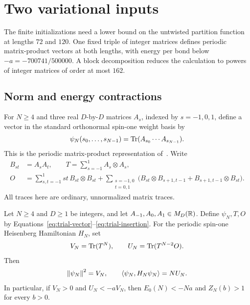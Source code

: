 \section{Two variational inputs}\label{sec:trials}

The finite initializations need a lower bound on the untwisted partition
function at lengths $72$ and $120$. One fixed triple of integer matrices
defines periodic matrix-product vectors at both lengths, with energy per bond below
$-a=-700741/500000$. A block decomposition reduces the calculation to
powers of integer matrices of order at most $162$.

\subsection{Norm and energy contractions}

For $N\ge4$ and three real $D$-by-$D$ matrices $A_s$, indexed by $s=-1,0,1$, define
a vector in the standard orthonormal spin-one weight basis by
\begin{equation}\label{eq:trial-vector}
 \psi_N(s_0,\ldots,s_{N-1})
 =\operatorname{Tr}(A_{s_0}\cdots A_{s_{N-1}}).
\end{equation}
This is the periodic matrix-product representation
of~\cite[Section~2.1, Equations~(2)--(3)]{PerezGarcia2007}.
Write
\begin{align}
 B_{st}&=A_sA_t,\qquad T=\sum_{s=-1}^1 A_s\otimes A_s,
 \label{eq:trial-transfer}\\
 O&=\sum_{s,t=-1}^1 st\,B_{st}\otimes B_{st}
   +\sum_{\substack{s=-1,0\\t=0,1}}
    \bigl(B_{st}\otimes B_{s+1,t-1}
       +B_{s+1,t-1}\otimes B_{st}\bigr).
 \label{eq:trial-insertion}
\end{align}
All traces here are ordinary, unnormalized matrix traces.

\begin{lemma}\label{lem:trial-contraction}
Let $N\ge4$ and $D\ge1$ be integers, and let $A_{-1},A_0,A_1\in M_D(\mathbb R)$.
Define $\psi_N,T,O$ by Equations~\eqref{eq:trial-vector}--\eqref{eq:trial-insertion}.
For the periodic spin-one Heisenberg Hamiltonian $H_N$, set
\[
 V_N=\operatorname{Tr}(T^N),\qquad U_N=\operatorname{Tr}(T^{N-2}O).
\]
Then
\[
 \left\lVert \psi_N\right\rVert^2=V_N,\qquad
 \langle\psi_N,H_N\psi_N\rangle=NU_N.
\]
In particular, if $V_N>0$ and $U_N<-aV_N$, then
$E_0(N)<-Na$ and $Z_N(b)>1$ for every $b>0$.
\end{lemma}

